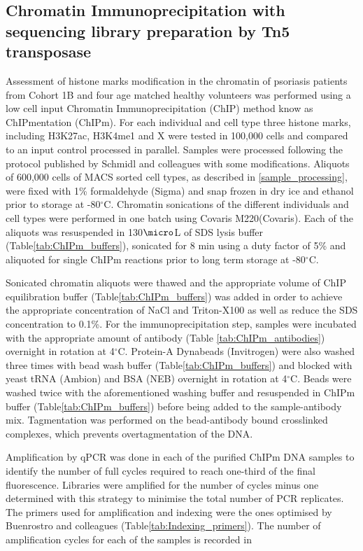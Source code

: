 \subsection{Chromatin Immunoprecipitation with sequencing library preparation by Tn5 transposase}
Assessment of histone marks modification in the chromatin of psoriasis patients from Cohort 1B and four age matched healthy volunteers was performed using a low cell input Chromatin Immunoprecipitation (ChIP) method know as ChIPmentation (ChIPm). For each individual and cell type three histone marks, including H3K27ac, H3K4me1 and X were tested in 100,000 cells and compared to an input control processed in parallel. Samples were processed following the protocol published by Schmidl and colleagues \parencite{Schmidl2015} with some modifications. Aliquots of 600,000 cells of MACS sorted cell types, as described in \ref{sample_processing}, were fixed with 1\% formaldehyde (Sigma) and snap frozen in dry ice and ethanol prior to storage at -80{$^\circ$}C. Chromatin sonications of the different individuals and cell types were performed in one batch using Covaris M220(Covaris). Each of the aliquots was resuspended in 130$\micro$L of SDS lysis buffer (Table\ref{tab:ChIPm_buffers}), sonicated for 8 min using a duty factor of 5\% and aliquoted for single ChIPm reactions prior to long term storage at -80{$^\circ$}C.

Sonicated chromatin aliquots were thawed and the appropriate volume of ChIP equilibration buffer (Table\ref{tab:ChIPm_buffers}) was added in order to achieve the appropriate concentration of NaCl and Triton-X100 as well as reduce the SDS concentration to 0.1\%. For the immunoprecipitation step, samples were incubated with the appropriate amount of antibody (Table \ref{tab:ChIPm_antibodies}) overnight in rotation  at 4{$^\circ$}C. Protein-A Dynabeads (Invitrogen) were also washed three times with bead wash buffer (Table\ref{tab:ChIPm_buffers}) and blocked with yeast tRNA (Ambion) and BSA (NEB) overnight in rotation at 4{$^\circ$}C. Beads were washed twice with the aforementioned washing buffer and resuspended in ChIPm buffer (Table\ref{tab:ChIPm_buffers}) before being added to the sample-antibody mix. Tagmentation was performed on the bead-antibody bound crosslinked complexes, which prevents overtagmentation of the DNA. 

Amplification by qPCR was done in each of the purified ChIPm DNA samples to identify the number of full cycles required to reach one-third of the final fluorescence. Libraries were amplified for the number of cycles minus one determined with this strategy to minimise the total number of PCR replicates. The primers used for amplification and indexing were the ones optimised by Buenrostro and colleagues (Table\ref{tab:Indexing_primers}). The number of amplification cycles for each of the samples is recorded in %

